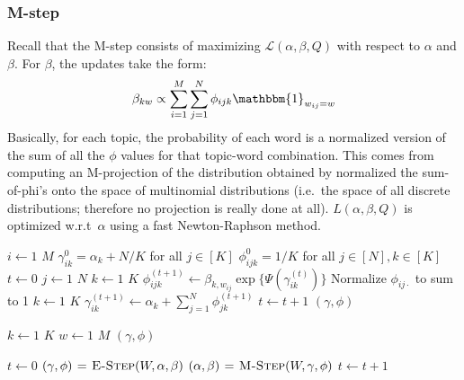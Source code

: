 \documentclass[letterpaper]{article}
\begin{document}
\subsubsection{M-step}
Recall that the M-step consists of maximizing $\mathcal{L}(\alpha, \beta, Q)$ with respect to $\alpha$ and $\beta$. For $\beta$, the updates take the form:
\begin{align}
    \beta_{kw} \propto \sum_{i=1}^M \sum_{j=1}^N \phi_{ijk}\mathbbm{1}_{w_{ij} = w}
\end{align}
Basically, for each topic, the probability of each word is a normalized version of the sum of all the $\phi$ values for that topic-word combination. This comes from computing an M-projection of the distribution obtained by normalized the sum-of-phi's onto the space of multinomial distributions (i.e.\ the space of all discrete distributions; therefore no projection is really done at all). $L(\alpha, \beta, Q)$ is optimized w.r.t\ $\alpha$ using a fast Newton-Raphson method.

\begin{codebox}
\li\For$i \gets 1$ \To$M$
\li    \Do$\gamma^0_{ik} = \alpha_k+ N/K$ for all $j \in[K]$
\li    $\phi^0_{ijk} = 1/K$ for all $j \in[N], k \in[K]$
\li    $t \gets 0$
\li    \While{}
\li        \Do\For$j \gets 1$ \To$N$
\li            \Do\For$k \gets 1$ \To$K$
\li                \Do$\phi^{(t+1)}_{ijk} \gets \beta_{k,w_{ij}} \exp\{\Psi(\gamma^{(t)}_{ik})\}$
                \End
\li            Normalize $\phi_{ij\cdot}$ to sum to 1
            \End
\li        \For$k \gets 1$ \To$K$
\li            \Do$\gamma^{(t+1)}_{ik} \gets \alpha_k+ \sum_{j=1}^N \phi^{(t+1)}_{jk}$
            \End
\li        $t \gets t + 1$
        \End
    \End
\li\Return$(\gamma, \phi)$
\end{codebox}

\begin{codebox}
\li\For$k \gets1$ \To$K$
\li     \Do \For $w \gets 1$ \To$M$
\li         \Do \For
        \End
    \End
\li\Return$(\gamma, \phi)$
\end{codebox}

\begin{codebox}
\li$t \gets0$
\li\While{}
\li    \Do$(\gamma, \phi) \mathrel{\hspace{1pt}=\hspace{1pt}} \textnormal{\scshape E-Step}(W, \alpha, \beta)$
\li    $(\alpha, \beta) \mathrel{\hspace{1pt}=\hspace{1pt}} \textnormal{\scshape M-Step}(W, \gamma, \phi)$
\li    $t \gets t + 1$
   \End
\end{codebox}
\end{document}
